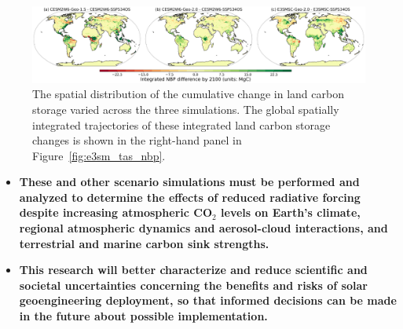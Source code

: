 \vskip0.25in

\begin{figure}
	\begin{center}
		\includegraphics[width=\columnwidth]{figures/e3sm_geo_nbp_map.png}
	\end{center}
	\caption{The spatial distribution of the cumulative change in land carbon storage varied across the three simulations. The global spatially integrated trajectories of these integrated land carbon storage changes is shown in the right-hand panel in Figure~\ref{fig:e3sm_tas_nbp}.}\label{fig:e3sm_nbp_map}
\end{figure}

\begin{itemize}
	\item \textbf{These and other scenario simulations must be performed and analyzed to determine the effects of reduced radiative forcing despite increasing atmospheric CO$_2$ levels on Earth's climate, regional atmospheric dynamics and aerosol-cloud interactions, and terrestrial and marine carbon sink strengths.}

	\item \textbf{This research will better characterize and reduce scientific and societal uncertainties concerning the benefits and risks of solar geoengineering deployment, so that informed decisions can be made in the future about possible implementation.}

\end{itemize}


